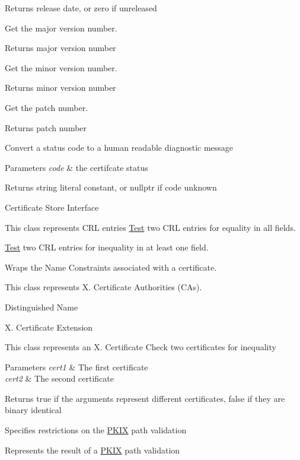 \begin{DoxyReturn}{Returns}
release date, or zero if unreleased
\end{DoxyReturn}
Get the major version number. \begin{DoxyReturn}{Returns}
major version number
\end{DoxyReturn}
Get the minor version number. \begin{DoxyReturn}{Returns}
minor version number
\end{DoxyReturn}
Get the patch number. \begin{DoxyReturn}{Returns}
patch number
\end{DoxyReturn}
Convert a status code to a human readable diagnostic message 
\begin{DoxyParams}{Parameters}
{\em code} & the certifcate status \\
\hline
\end{DoxyParams}
\begin{DoxyReturn}{Returns}
string literal constant, or nullptr if code unknown
\end{DoxyReturn}
Certificate Store Interface

This class represents C\+RL entries \mbox{\hyperlink{class_test}{Test}} two C\+RL entries for equality in all fields.

\mbox{\hyperlink{class_test}{Test}} two C\+RL entries for inequality in at least one field.

Wraps the Name Constraints associated with a certificate.

This class represents X. Certificate Authorities (C\+As).

Distinguished Name

X. Certificate Extension

This class represents an X. Certificate Check two certificates for inequality 
\begin{DoxyParams}{Parameters}
{\em cert1} & The first certificate \\
\hline
{\em cert2} & The second certificate \\
\hline
\end{DoxyParams}
\begin{DoxyReturn}{Returns}
true if the arguments represent different certificates, false if they are binary identical
\end{DoxyReturn}
Specifies restrictions on the \mbox{\hyperlink{namespace_botan_1_1_p_k_i_x}{P\+K\+IX}} path validation

Represents the result of a \mbox{\hyperlink{namespace_botan_1_1_p_k_i_x}{P\+K\+IX}} path validation

